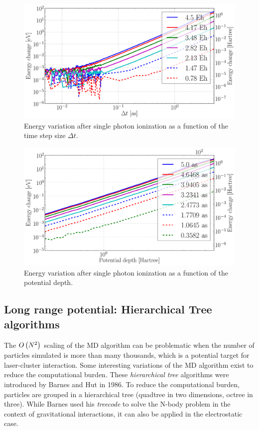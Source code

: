 \begin{figure}
 \centering
 \includegraphics[width=\figurewidth]{figures/numerical_heating_dt}
 \caption{\label{fig:potential:heating:dt}Energy variation after single photon
          ionization as a function of the time step size $\Delta t$.}
\end{figure}

\begin{figure}
 \centering
 \includegraphics[width=\figurewidth]{figures/numerical_heating_D}
 \caption{\label{fig:potential:heating:depth}Energy variation after single photon
          ionization as a function of the potential depth.}
\end{figure}





\subsection{Long range potential: Hierarchical Tree algorithms}

The $O\left( N^2 \right)$ scaling of the MD algorithm can be problematic when the number of
particles simulated is more than many thousands, which is a potential target
for laser-cluster interaction. Some interesting variations of the MD algorithm
exist to reduce the computational burden. These \textit{hierarchical tree}
algorithms were introduced by Barnes and Hut in 1986\cite{Barnes1986}. To
reduce the computational burden, particles are grouped in a hierarchical tree
(quadtree in two dimensions, octree in three). While Barnes used his
\textit{treecode} to solve the N-body problem in the context of gravitational
interactions, it can also be applied in the electrostatic case.

